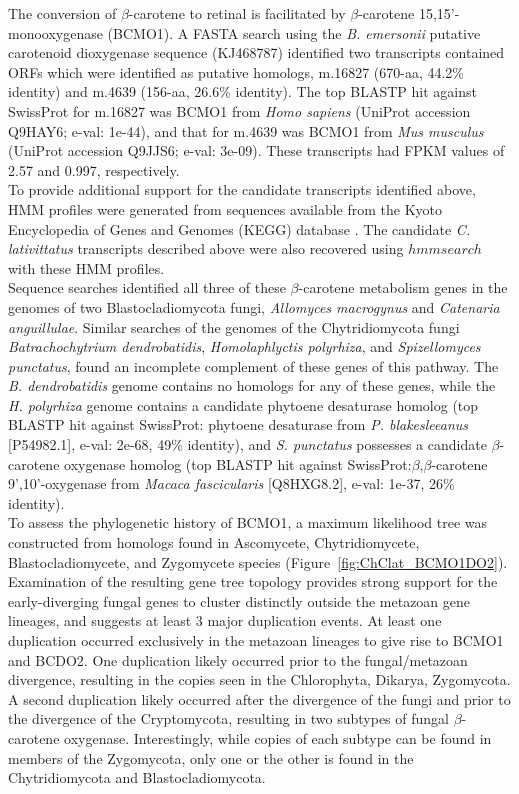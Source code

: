 \indent The conversion of $\beta$-carotene to retinal is facilitated by $\beta$-carotene 15,15'-monooxygenase (BCMO1). A FASTA search using the \textit{B. emersonii} putative carotenoid dioxygenase sequence (KJ468787) identified two transcripts contained ORFs which were identified as putative homologs, m.16827 (670-aa, 44.2\% identity) and m.4639 (156-aa, 26.6\% identity). The top BLASTP hit against SwissProt for m.16827 was BCMO1 from \textit{Homo sapiens} (UniProt accession Q9HAY6; e-val: 1e-44), and that for m.4639 was BCMO1 from \textit{Mus musculus} (UniProt accession Q9JJS6; e-val: 3e-09). These transcripts had FPKM values of 2.57 and 0.997, respectively. \\
\indent To provide additional support for the candidate transcripts identified above, HMM profiles were generated from sequences available from the Kyoto Encyclopedia of Genes and Genomes (KEGG) database \cite{Kanehisa2000,Kanehisa2014}. The candidate \textit{C. lativittatus} transcripts described above were also recovered using $hmmsearch$ with these HMM profiles. \\
\indent Sequence searches identified all three of these $\beta$-carotene metabolism genes in the genomes of two Blastocladiomycota fungi, \textit{Allomyces macrogynus} and \textit{Catenaria anguillulae}. Similar searches of the genomes of the Chytridiomycota fungi \textit{Batrachochytrium dendrobatidis}, \textit{Homolaphlyctis polyrhiza}, and \textit{Spizellomyces punctatus}, found an incomplete complement of these genes of this pathway. The \textit{B. dendrobatidis} genome contains no homologs for any of these genes, while the \textit{H. polyrhiza} genome contains a candidate phytoene desaturase homolog (top BLASTP hit against SwissProt: phytoene desaturase from \textit{P. blakesleeanus} [P54982.1], e-val: 2e-68, 49\% identity), and \textit{S. punctatus} possesses a candidate $\beta$-carotene oxygenase homolog (top BLASTP hit against SwissProt:$\beta$,$\beta$-carotene 9',10'-oxygenase from \textit{Macaca fascicularis} [Q8HXG8.2], e-val: 1e-37, 26\% identity).\\
\indent To assess the phylogenetic history of BCMO1, a maximum likelihood tree was constructed from homologs found in Ascomycete, Chytridiomycete, Blastocladiomycete, and Zygomycete species (Figure~\ref{fig:ChClat_BCMO1DO2}). Examination of the resulting gene tree topology provides strong support for the early-diverging fungal genes to cluster distinctly outside the metazoan gene lineages, and suggests at least 3 major duplication events. At least one duplication occurred exclusively in the metazoan lineages to give rise to BCMO1 and BCDO2. One duplication likely occurred prior to the fungal/metazoan divergence, resulting in the copies seen in the Chlorophyta, Dikarya, Zygomycota. A second duplication likely occurred after the divergence of the fungi and prior to the divergence of the Cryptomycota, resulting in two subtypes of fungal $\beta$-carotene oxygenase. Interestingly, while copies of each subtype can be found in members of the Zygomycota, only one or the other is found in the Chytridiomycota and Blastocladiomycota.\\

